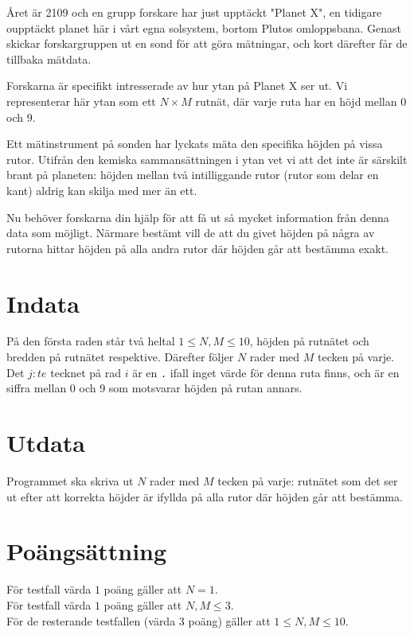 Året är 2109 och en grupp forskare har just upptäckt "Planet X", 
en tidigare oupptäckt planet här i vårt egna solsystem,
bortom Plutos omloppsbana. Genast skickar forskargruppen ut
en sond för att göra mätningar, och kort därefter får de tillbaka mätdata.

Forskarna är specifikt intresserade av hur ytan på Planet X ser ut.
Vi representerar här ytan som ett $N \times M$ rutnät, där varje ruta
har en höjd mellan 0 och 9.

Ett mätinstrument på sonden har lyckats mäta den specifika höjden
på vissa rutor. Utifrån den kemiska sammansättningen i ytan vet vi att det inte 
är särskilt brant på planeten: höjden mellan två
intilliggande rutor (rutor som delar en kant) aldrig kan skilja 
med mer än ett. 

Nu behöver forskarna din hjälp för att få ut så mycket information
från denna data som möjligt. Närmare bestämt vill de att du givet höjden
på några av rutorna hittar höjden på alla andra rutor där höjden
går att bestämma exakt.

\section*{Indata}
På den första raden står två heltal $1 \le N,M \le 10$, 
höjden på rutnätet och bredden på rutnätet respektive.
Därefter följer $N$ rader med $M$ tecken på varje.
Det $j:te$ tecknet på rad $i$ är en \texttt{.} ifall
inget värde för denna ruta finns, och är en siffra mellan
0 och 9 som motsvarar höjden på rutan annars.

\section*{Utdata}
Programmet ska skriva ut $N$ rader med $M$ tecken på varje:
rutnätet som det ser ut efter att
korrekta höjder är ifyllda på alla rutor där höjden går att bestämma.

\section*{Poängsättning}
För testfall värda $1$ poäng gäller att $N=1$. \\
För testfall värda $1$ poäng gäller att $N,M \leq 3$. \\
För de resterande testfallen (värda $3$ poäng) gäller att $1\leq N,M \leq 10$.
